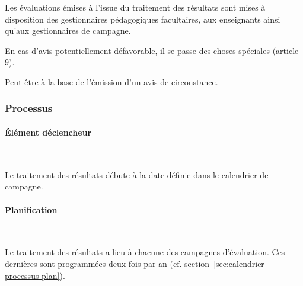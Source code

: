 \documentclass[a4paper,11pt]{report}
\begin{document}

Les évaluations émises à l'issue du traitement des résultats sont mises à disposition des gestionnaires pédagogiques facultaires, aux enseignants ainsi qu'aux gestionnaires de campagne.

En cas d'avis potentiellement défavorable, il se passe des choses spéciales (article 9).

Peut être à la base de l'émission d'un avis de circonstance.


\subsubsection{Processus}
\paragraph{Élément déclencheur}~\newline{}

Le traitement des résultats débute à la date définie dans le calendrier de campagne.

\paragraph{Planification}~\newline{}

Le traitement des résultats a lieu à chacune des campagnes d'évaluation.
Ces dernières sont programmées deux fois par an (cf. section~\ref{sec:calendrier-processus-plan}).
\end{document}
